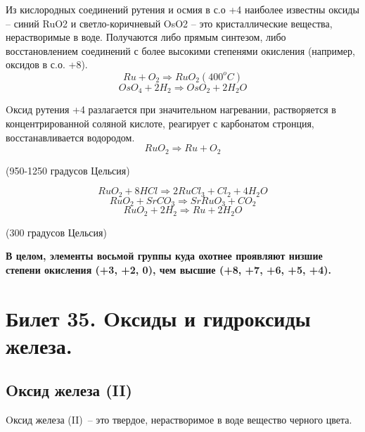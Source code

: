 \documentclass[11pt]{article}
\begin{document}
Из кислородных соединений рутения и осмия в с.о +4 наиболее известны оксиды – синий
RuO2 и светло-коричневый OsO2 – это кристаллические вещества, нерастворимые в воде.
Получаются либо прямым синтезом, либо восстановлением соединений с более
высокими степенями окисления (например, оксидов в с.о. +8).
$$Ru + O _2 \Rightarrow RuO _2 (400^oC)$$
$$OsO _4 + 2H _2 \Rightarrow OsO _2 + 2H _2 O$$

Oксид рутения +4 разлагается при значительном нагревании, растворяется в
концентрированной соляной кислоте, реагирует с карбонатом стронция,
восстанавливается водородом.
$$RuO _2 \Rightarrow Ru + O _2 $$
\begin{center}(950-1250 градусов Цельсия)\end{center}
$$RuO _2 + 8HCl \Rightarrow 2RuCl _3 + Cl _2 + 4H _2 O$$
$$RuO _2 + SrCO _3 \Rightarrow SrRuO _3 + CO _2$$
$$RuO _2 + 2H _2 \Rightarrow Ru + 2H _2 O $$
\begin{center}(300 градусов Цельсия)\end{center}
\textbf{В целом, элементы восьмой группы куда охотнее проявляют низшие степени окисления
(+3, +2, 0), чем высшие (+8, +7, +6, +5, +4).
}
\section{Билет 35. Oксиды и гидроксиды железа.}
\subsection{Oксид железа (II)}
Oксид железа (II) – это твердое, нерастворимое в воде вещество черного цвета.
\end{document}
